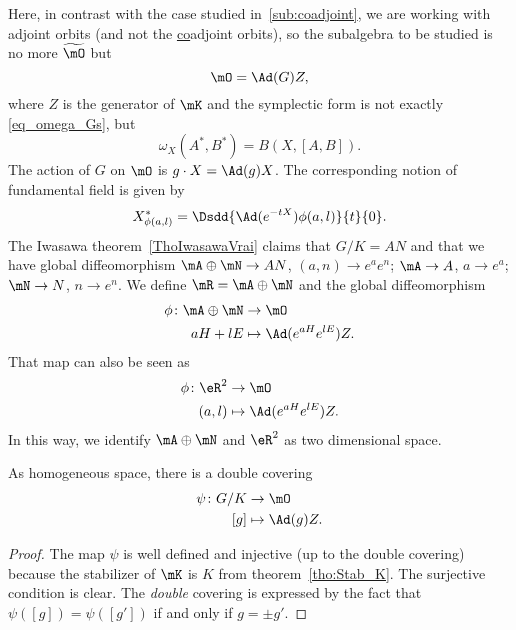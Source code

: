 Here, in contrast with the case studied in~\ref{sub:coadjoint}, we are working with adjoint orbits (and not the \underline{co}adjoint orbits), so the subalgebra to be studied is no more $\widetilde{\mO}$ but
\[
	\mO=\Ad(G)Z,
\]
where $Z$ is the generator of $\mK$ and the symplectic form is not exactly \eqref{eq_omega_Gs}, but
\begin{equation}\label{eq:omega_G}
	\omega_X(A^*,B^*)=B(X,[A,B]).
\end{equation}
The action of $G$ on $\mO$ is $g\cdot X=\Ad(g)X$. The corresponding notion of fundamental field is given by
\[
	X^*_{\phi(a,l)}=\Dsdd{ \Ad(e^{-tX})\phi(a,l) }{t}{0}.
\]
The Iwasawa theorem~\ref{ThoIwasawaVrai} claims that $G/K=AN$ and that we have global diffeomorphism $\mA\oplus\mN\to AN$, $(a,n)\to e^ae^n$; $\mA\to A$, $a\to e^a$; $\mN\to N$, $n\to e^n$. We define $\mR=\mA\oplus\mN$ and the global diffeomorphism
\begin{equation}    \label{EqDefphiaHlEZ}
	\begin{aligned}
		\phi\colon \mA\oplus\mN & \to \mO                       \\
		aH+lE                   & \mapsto \Ad( e^{aH} e^{lE})Z.
	\end{aligned}
\end{equation}
That map can also be seen as
\begin{equation}
	\begin{aligned}
		\phi\colon\eR^2 & \to \mO                    \\
		(a,l)           & \mapsto\Ad(e^{aH}e^{lE})Z.
	\end{aligned}
\end{equation}
In this way, we identify $\mA\oplus\mN$ and $\eR^2$ as two dimensional space.
\begin{proposition}
	As homogeneous space, there is a double covering
	\begin{equation}
		\begin{aligned}
			\psi\colon G/K & \to \mO          \\
			[g]            & \mapsto \Ad(g)Z.
		\end{aligned}
	\end{equation}

\end{proposition}
\begin{proof}
	The map $\psi$ is well defined and injective (up to the double covering) because the stabilizer of $\mK$ is $K$ from theorem~\ref{tho:Stab_K}. The surjective condition is clear. The \emph{double} covering is expressed by the fact that $\psi([g])=\psi([g'])$ if and only if $g=\pm g'$.
\end{proof}


